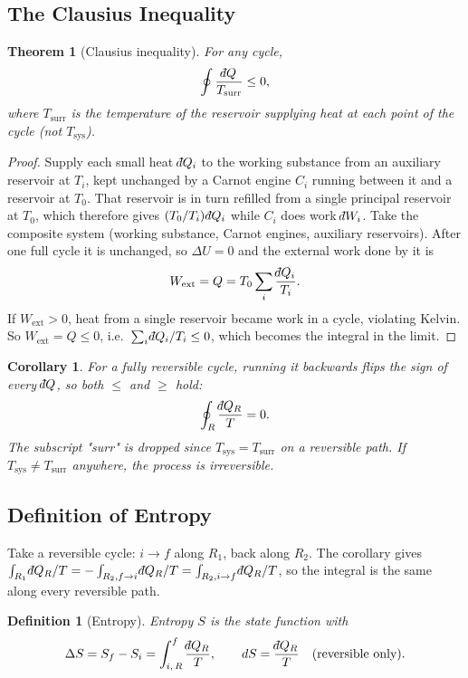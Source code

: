 \documentclass{article}
\newtheorem{theorem}{Theorem}
\newtheorem{corollary}{Corollary}[theorem]
\newtheorem{definition}{Definition}
\newcommand{\dbar}{\mathchar'26\mkern-12mu d}
\begin{document}
\subsection{The Clausius Inequality}
\begin{theorem}[Clausius inequality]
    For any cycle,
    \[\oint \frac{\dbar Q}{T_{\text{surr}}} \leq 0,\]
    where $T_{\text{surr}}$ is the temperature of the reservoir supplying heat at each point of the cycle (not $T_{\text{sys}}$).
\end{theorem}
\begin{proof}
    Supply each small heat $\dbar Q_i$ to the working substance from an auxiliary reservoir at $T_i$, kept unchanged by a Carnot engine $C_i$ running between it and a reservoir at $T_0$. That reservoir is in turn refilled from a single principal reservoir at $T_0$, which therefore gives $(T_0/T_i)\,\dbar Q_i$ while $C_i$ does work $\dbar W_i$. Take the composite system (working substance, Carnot engines, auxiliary reservoirs). After one full cycle it is unchanged, so $\Delta U = 0$ and the external work done by it is
    \[W_{\text{ext}} = Q = T_0 \sum_i \frac{\dbar Q_i}{T_i}.\]
    If $W_{\text{ext}} > 0$, heat from a single reservoir became work in a cycle, violating Kelvin. So $W_{\text{ext}} = Q \leq 0$, i.e.\ $\sum_i \dbar Q_i / T_i \leq 0$, which becomes the integral in the limit.
\end{proof}

\begin{corollary}
    For a fully reversible cycle, running it backwards flips the sign of every $\dbar Q$, so both $\leq$ and $\geq$ hold:
    \[\oint_R \frac{\dbar Q_R}{T} = 0.\]
    The subscript "surr" is dropped since $T_{\text{sys}} = T_{\text{surr}}$ on a reversible path. If $T_{\text{sys}} \neq T_{\text{surr}}$ anywhere, the process is irreversible.
\end{corollary}

\subsection{Definition of Entropy}
Take a reversible cycle: $i \to f$ along $R_1$, back along $R_2$. The corollary gives $\int_{R_1} \dbar Q_R/T = -\int_{R_2, f\to i} \dbar Q_R/T = \int_{R_2, i \to f} \dbar Q_R/T$, so the integral is the same along every reversible path.

\begin{definition}[Entropy]
    Entropy $S$ is the state function with
    \[\Delta S = S_f - S_i = \int_{i,\,R}^{f} \frac{\dbar Q_R}{T}, \qquad dS = \frac{\dbar Q_R}{T} \quad \text{(reversible only)}.\]
\end{definition}
\end{document}
